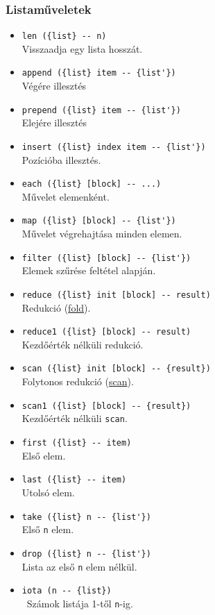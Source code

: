 \documentclass[a4paper]{article}
\begin{document}
\subsubsection*{Listaműveletek}
\begin{itemize}
\item \verb|len ({list} -- n)|\\ Visszaadja egy lista hosszát.
\item \verb|append ({list} item -- {list'})|\\ Végére illesztés
\item \verb|prepend ({list} item -- {list'})|\\ Elejére illesztés
\item \verb|insert ({list} index item -- {list'})|\\ Pozícióba illesztés.
\item \verb|each ({list} [block] -- ...)|\\ Művelet elemenként.
\item \verb|map ({list} [block] -- {list'})|\\ Művelet végrehajtása minden elemen.
\item \verb|filter ({list} [block] -- {list'})|\\ Elemek szűrése feltétel alapján.
\item \verb|reduce ({list} init [block] -- result)|\\ Redukció (\href{https://en.wikipedia.org/wiki/Fold_(higher-order_function)}{fold}).
\item \verb|reduce1 ({list} [block] -- result)|\\ Kezdőérték nélküli redukció.
\item \verb|scan ({list} init [block] -- {result})|\\ Folytonos redukció (\href{https://en.wikipedia.org/wiki/Prefix_sum#Scan_higher_order_function}{scan}).
\item \verb|scan1 ({list} [block] -- {result})|\\ Kezdőérték nélküli \verb|scan|.
\item \verb|first ({list} -- item)|\\ Első elem.
\item \verb|last ({list} -- item)|\\ Utolsó elem.
\item \verb|take ({list} n -- {list'})|\\ Első \verb|n| elem.
\item \verb|drop ({list} n -- {list'})|\\ Lista az első \verb|n| elem nélkül.
\item \verb|iota (n -- {list})|\\ Számok listája 1-től \verb|n|-ig.
\end{itemize}
\end{document}
